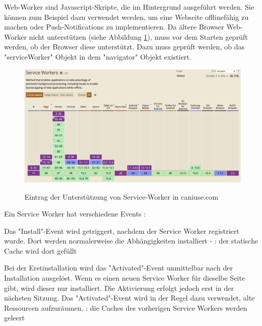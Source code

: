

Web-Worker sind Javascript-Skripte, die im Hintergrund ausgeführt werden. 
Sie können zum Beispiel dazu verwendet werden, um eine Webseite offlinefähig zu machen oder Push-Notifications zu implementieren.
Da ältere Browser Web-Worker nicht unterstützen (siehe Abbildung \ref{fig:CanIUseServiceWorker}), muss vor dem Starten geprüft werden, ob der Browser diese unterstützt. 
Dazu muss geprüft werden, ob das "serviceWorker" Objekt in dem "navigator" Objekt existiert. 

\begin{figure}[H]
    \centering
    \includegraphics[width=\textwidth]{media/ServiceWorker/CanIUseServiceWorker.png}
    \caption{Eintrag der Unterstützung von Service-Worker in caniuse.com}
    \cite{ciuServiceWorker}
    \label{fig:CanIUseServiceWorker}
\end{figure}


Ein Service Worker hat verschiedene Events \cite{MDNCacheAPI}: 


Das "Install"-Event wird getriggert, nachdem der Service Worker registriert wurde. Dort werden normalerweise die Abhängigkeiten installiert - \zb: der statische Cache wird dort gefüllt 


Bei der Erstinstallation wird das "Activated"-Event unmittelbar nach der Installation ausgelöst. Wenn es einen neuen Service Worker für dieselbe Seite gibt, wird dieser nur installiert. Die Aktivierung erfolgt jedoch erst in der nächsten Sitzung. Das "Activated"-Event wird in der Regel dazu verwendet, alte Ressourcen aufzuräumen. \zb: die Caches des vorherigen Service Workers werden geleert

